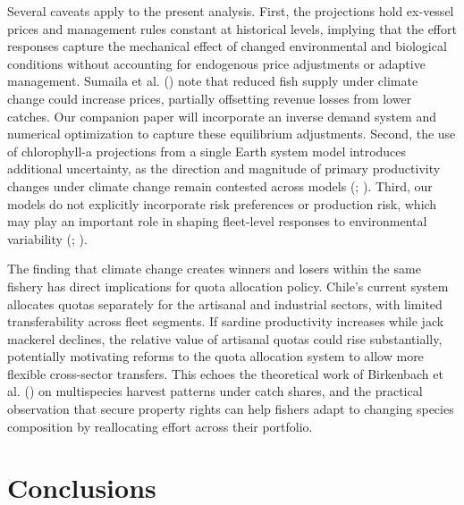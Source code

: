 \documentclass[
  11pt,
]{article}
\begin{document}
Several caveats apply to the present analysis. First, the projections hold ex-vessel prices and management rules constant at historical levels, implying that the effort responses capture the mechanical effect of changed environmental and biological conditions without accounting for endogenous price adjustments or adaptive management. Sumaila et al. () note that reduced fish supply under climate change could increase prices, partially offsetting revenue losses from lower catches. Our companion paper will incorporate an inverse demand system and numerical optimization to capture these equilibrium adjustments. Second, the use of chlorophyll-a projections from a single Earth system model introduces additional uncertainty, as the direction and magnitude of primary productivity changes under climate change remain contested across models (; ). Third, our models do not explicitly incorporate risk preferences or production risk, which may play an important role in shaping fleet-level responses to environmental variability (; ).

The finding that climate change creates winners and losers within the same fishery has direct implications for quota allocation policy. Chile's current system allocates quotas separately for the artisanal and industrial sectors, with limited transferability across fleet segments. If sardine productivity increases while jack mackerel declines, the relative value of artisanal quotas could rise substantially, potentially motivating reforms to the quota allocation system to allow more flexible cross-sector transfers. This echoes the theoretical work of Birkenbach et al. () on multispecies harvest patterns under catch shares, and the practical observation that secure property rights can help fishers adapt to changing species composition by reallocating effort across their portfolio.

\section{Conclusions}\label{conclusions}
\end{document}
